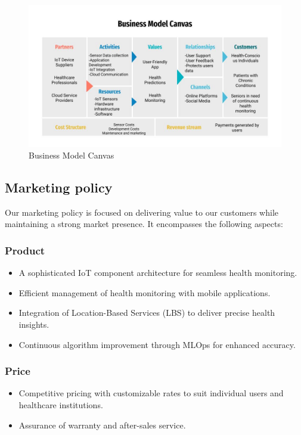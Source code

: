 \documentclass[12pt]{article}
\begin{document}
\begin{figure}[H]
    \centering
    \includegraphics[width=1.\textwidth]{bmc.jpg}
    \caption{Business Model Canvas}
    \label{fig:bmc}
\end{figure}

\subsection{Marketing policy}
Our marketing policy is focused on delivering value to our customers while maintaining a strong market presence. It encompasses the following aspects:

\subsubsection{Product}
\begin{itemize}
    \item A sophisticated IoT component architecture for seamless health monitoring.
    \item Efficient management of health monitoring with mobile applications.
    \item Integration of Location-Based Services (LBS) to deliver precise health insights.
    \item Continuous algorithm improvement through MLOps for enhanced accuracy.
    

\end{itemize}
\subsubsection{Price}
\begin{itemize}
    \item Competitive pricing with customizable rates to suit individual users and healthcare institutions.
    \item Assurance of warranty and after-sales service.
\end{itemize}
\end{document}

